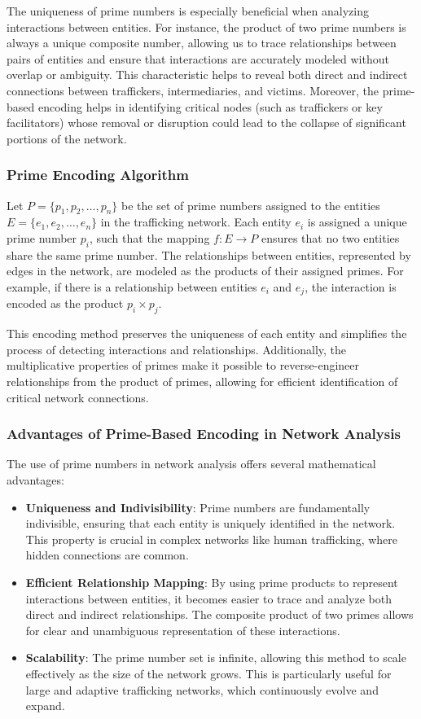 \documentclass[%
 preprint, linenumbers,
 amsmath,amssymb,
 aps, physrev,
]{revtex4-2}
\begin{document}
The uniqueness of prime numbers is especially beneficial when analyzing interactions between entities. For instance, the product of two prime numbers is always a unique composite number, allowing us to trace relationships between pairs of entities and ensure that interactions are accurately modeled without overlap or ambiguity. This characteristic helps to reveal both direct and indirect connections between traffickers, intermediaries, and victims. Moreover, the prime-based encoding helps in identifying critical nodes (such as traffickers or key facilitators) whose removal or disruption could lead to the collapse of significant portions of the network.

\subsubsection{Prime Encoding Algorithm}

Let $P = \{p_1, p_2, \dots, p_n\}$ be the set of prime numbers assigned to the entities $E = \{e_1, e_2, \dots, e_n\}$ in the trafficking network. Each entity $e_i$ is assigned a unique prime number $p_i$, such that the mapping $f: E \to P$ ensures that no two entities share the same prime number. The relationships between entities, represented by edges in the network, are modeled as the products of their assigned primes. For example, if there is a relationship between entities $e_i$ and $e_j$, the interaction is encoded as the product $p_i \times p_j$.

This encoding method preserves the uniqueness of each entity and simplifies the process of detecting interactions and relationships. Additionally, the multiplicative properties of primes make it possible to reverse-engineer relationships from the product of primes, allowing for efficient identification of critical network connections.

\subsubsection{Advantages of Prime-Based Encoding in Network Analysis}

The use of prime numbers in network analysis offers several mathematical advantages:
\begin{itemize}
    \item \textbf{Uniqueness and Indivisibility}: Prime numbers are fundamentally indivisible, ensuring that each entity is uniquely identified in the network. This property is crucial in complex networks like human trafficking, where hidden connections are common.
    \item \textbf{Efficient Relationship Mapping}: By using prime products to represent interactions between entities, it becomes easier to trace and analyze both direct and indirect relationships. The composite product of two primes allows for clear and unambiguous representation of these interactions.
    \item \textbf{Scalability}: The prime number set is infinite, allowing this method to scale effectively as the size of the network grows. This is particularly useful for large and adaptive trafficking networks, which continuously evolve and expand.
\end{itemize}
\end{document}
